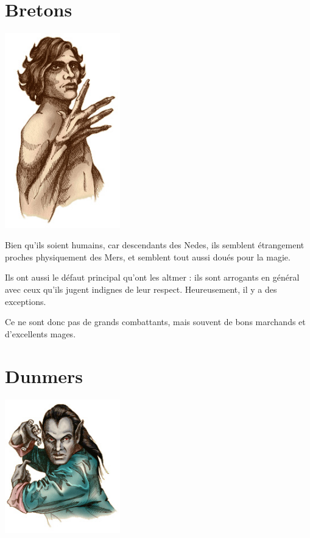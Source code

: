   \section{Bretons}
  
  \begin{center}
  \includegraphics[width=5cm]{images/race_breton.jpg}
  \end{center}

  Bien qu'ils soient humains, car descendants des Nedes, ils semblent étrangement proches physiquement des Mers, et semblent tout aussi doués pour la magie.
  
  Ils ont aussi le défaut principal qu'ont les altmer : ils sont arrogants en général avec ceux qu'ils jugent indignes de leur respect. Heureusement, il y a des exceptions.
  
  Ce ne sont donc pas de grands combattants, mais souvent de bons marchands et d'excellents mages.

  \section{Dunmers}
  
  \begin{center}
  \includegraphics[width=5cm]{images/race_dunmer.jpg}
  \end{center}
  
